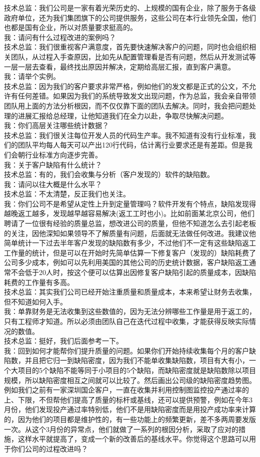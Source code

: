 技术总监：我们公司是一家有着光荣历史的、上规模的国有企业，除了服务于各级政府单位，还为我们集团旗下的公司提供服务，这些公司在本行业领先全国，他们也都是国有企业，所以对质量要求挺高的。\\
我：请问有什么过程改进的案例吗？\\
技术总监：我们很重视客户满意度，首先要快速解决客户的问题，同时也会组织相关团队，从过程入手查原因，比如先从配置管理看是否有问题，然后从开发测试等一层一层去查看，最终找出原因并解决，定期给高层汇报，直到客户满意。\\
我：请举个实例。\\
技术总监：因为我们的客户要求非常严格，例如他们的发文都是正式的公文，不允许有任何差错。如果因为我们的系统导致发文出现问题，作为总监，我会亲自带领团队用上面的方法分析根因，而不仅仅靠下面的团队去解决。同时，我会把问题处理的进展汇报给总经理，让他知道我们在全力以赴，争取尽快解决问题。\\
我：你们高层关注哪些统计数据？\\
技术总监：我们很关注每位开发人员的代码生产率。我不知道有没有行业标准，我们的团队平均每人每天可以产出120行代码，估计离行业要求还是有差距。但是我们会朝行业标准方向逐步完善。\\
我：关于客户缺陷有什么统计？\\
技术总监：有的，我们会收集与分析（客户发现的）软件的缺陷数。\\
我：请问以往大概是什么水平？\\
技术总监：不太清楚，反正我们也关注。\\
我：你们公司不是希望从定性上升到定量管理吗？软件开发有个特点，缺陷发现得越晚返工越多，发现越早越容易解决(返工工时也小)。比如前面某北京公司，他们聘请了一位很有经验的质量总监，想改进公司的质量，但他不知道怎么去引起老板的关注，因他深知如果领导不了解质量有问题，后面就无法做任何改进。我建议他简单统计一下过去半年客户发现的缺陷数有多少，不过他们不一定有这些缺陷返工工作量的统计，但是可以在开始时先简单估算一下修复客户（发现的）缺陷耗费了公司多少成本，例如可以先利用美国的其他公司的历史统计数据，客户缺陷返工通常不会低于20人时，按这个便可以估算出因修复客户缺陷引起的质量成本，因缺陷耗费的工作量有多高。\\
技术总监：其实我们公司已经开始注重质量和质量成本，本来希望让财务去收集，但不知道如何入手。\\
我：单靠财务是无法收集到这些数值的，因为无法分辨哪些工作量是用于返工的，只有工程师才知道。所以必须由团队自己在迭代过程中收集，才能获得反映实际情况的数值。\\
技术总监：挺好，我们后面参考一下。\\
我：回到如何才能帮你们提升质量的问题。如果你们开始持续收集每个月的客户缺陷数，并且把它归一到缺陷密度，因为我们不能单收集缺陷数，项目有大有小，一个大项目的5个缺陷不能等同于小项目的5个缺陷，而缺陷密度就是缺陷数除以项目规模，所以缺陷密度相互之间就可以比较了。然后画出公司级的缺陷密度趋势图。例如我们之前有一家深圳国企客户，一直在收集并利用控制图监控投产通过率的上、下限，不但帮他们提高了质量的标杆或基线，还可以提供预警，例如在今年3月份，他们发现投产通过率特别低，他们不是用缺陷密度而是用投产成功率来计算的，因为他们的项目都是维护性的，有一些功能上的频繁更新，差不多两周要发版一次。从这个3月份的异常点，他们就做了一系列的根因分析，采取了应对的措施，这样水平就提高了，变成一个新的改善后的基线水平。你觉得这个思路可以用于你们公司的过程改进吗？\\
